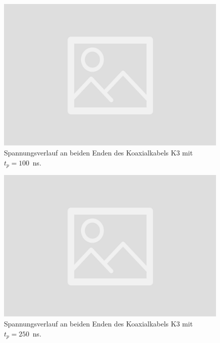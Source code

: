 \documentclass{article}
\begin{document}
\begin{figure}[H]
\centering
\caption{Spannungsverlauf an beiden Enden des Koaxialkabels K3 mit $t_p=100$~ns.}
\label{fig:task1a_100ns}
\includegraphics[scale=0.1]{bilder/task1a/leer.jpg}
\end{figure}

\begin{figure}[H]
\centering
\caption{Spannungsverlauf an beiden Enden des Koaxialkabels K3 mit $t_p=250$~ns.}
\label{fig:task1a_250ns}
\includegraphics[scale=0.1]{bilder/task1a/leer.jpg}
\end{figure}
\end{document}
